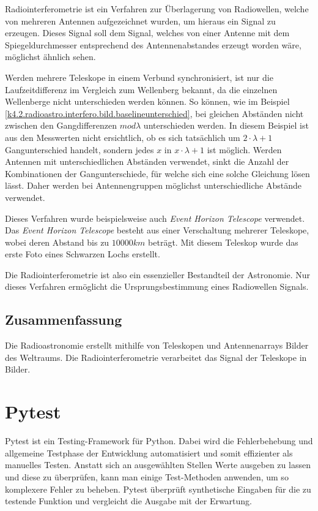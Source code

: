 \documentclass[]{dsadokumentation}
\begin{document}
Radiointerferometrie ist ein Verfahren zur Überlagerung von Radiowellen, welche von mehreren Antennen aufgezeichnet wurden, um hieraus ein Signal zu erzeugen. Dieses Signal soll dem Signal, welches von einer Antenne mit dem Spiegeldurchmesser entsprechend des Antennenabstandes erzeugt worden wäre, möglichst ähnlich sehen.

Werden mehrere Teleskope in einem Verbund synchronisiert, ist nur die Laufzeitdifferenz im Vergleich zum Wellenberg bekannt, da die einzelnen Wellenberge nicht unterschieden werden können. So können, wie im Beispiel  \cref{k4.2.radioastro.interfero.bild.baselineunterschied}, bei gleichen Abständen nicht zwischen den Gangdifferenzen $mod \lambda$ unterschieden werden. In diesem Beispiel ist aus den Messwerten nicht ersichtlich, ob es sich tatsächlich um $2\cdot \lambda +1$ Gangunterschied handelt, sondern jedes $x$ in $x\cdot\lambda+1$ ist möglich. Werden Antennen mit unterschiedlichen Abständen verwendet, sinkt die Anzahl der Kombinationen der Gangunterschiede, für welche sich eine solche Gleichung lösen lässt. Daher werden bei Antennengruppen möglichst unterschiedliche Abstände verwendet.

Dieses Verfahren wurde beispielsweise auch \emph{Event Horizon Telescope} verwendet. Das \emph{Event Horizon Telescope} besteht aus einer Verschaltung mehrerer Teleskope, wobei deren Abstand bis zu $10000km$ beträgt. Mit diesem Teleskop wurde das erste Foto eines Schwarzen Lochs erstellt.

Die Radiointerferometrie ist also ein essenzieller Bestandteil der Astronomie. Nur dieses Verfahren ermöglicht die Ursprungsbestimmung eines Radiowellen Signals.

\subsection{Zusammenfassung}
Die Radioastronomie erstellt mithilfe von Teleskopen und Antennenarrays Bilder des Weltraums. Die Radiointerferometrie verarbeitet das Signal der Teleskope in Bilder.

\section{Pytest}
Pytest ist ein Testing-Framework für Python. Dabei wird die Fehlerbehebung und allgemeine Testphase der Entwicklung automatisiert und somit effizienter als manuelles Testen. Anstatt sich an ausgewählten Stellen Werte ausgeben zu lassen und diese zu überprüfen, kann man einige Test-Methoden anwenden, um so komplexere Fehler zu beheben. Pytest überprüft synthetische Eingaben für die zu testende Funktion und vergleicht die Ausgabe mit der Erwartung.
\end{document}

